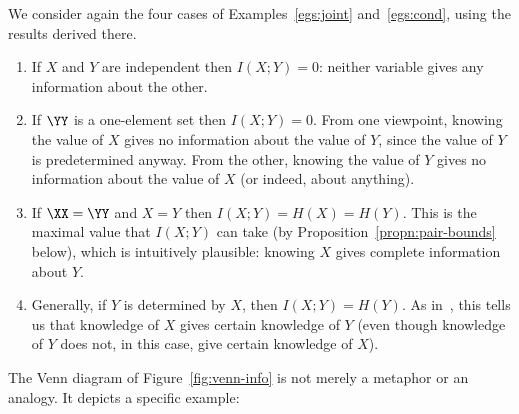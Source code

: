 \begin{examples}
We consider again the four cases of Examples~\ref{egs:joint}
and~\ref{egs:cond}, using the results derived there.

\begin{enumerate}
\item 
{}
If $X$ and $Y$ are independent then $I(X; Y) = 0$: neither variable gives
any information about the other.

\item 
{}
If $\YY$ is a one-element set then $I(X; Y) = 0$.  From one viewpoint,
knowing the value of $X$ gives no information about the value of $Y$, 
since the value of $Y$ is predetermined anyway.  From the other, knowing the
value of $Y$ gives no information about the value of $X$ (or indeed,
about anything).

\item 
{} 
If $\XX = \YY$ and $X = Y$ then $I(X; Y) = H(X) = H(Y)$.  This is the
maximal value that $I(X; Y)$ can take (by
Proposition~\ref{propn:pair-bounds} below), which is
intuitively plausible: knowing $X$ gives complete information about $Y$.

\item 
{}
Generally, if $Y$ is determined by $X$, then $I(X; Y) = H(Y)$.  As
in~, this tells us that knowledge of $X$ gives certain
knowledge of $Y$ (even though knowledge of $Y$ does not, in this case, give
certain knowledge of $X$).
\end{enumerate}
\end{examples}

The Venn diagram of Figure~\ref{fig:venn-info} is not merely a metaphor or
an analogy.  It depicts a specific example:

